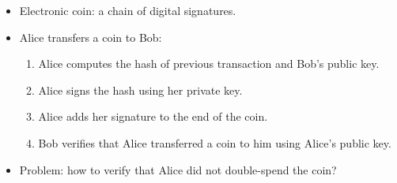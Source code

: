 \documentclass{article}
\begin{document}
\begin{itemize}
  \item Electronic coin: a chain of digital signatures.
  \item Alice transfers a coin to Bob:
    \begin{enumerate}
      \item Alice computes the hash of previous transaction and Bob's public
        key.
      \item Alice signs the hash using her private key.
      \item Alice adds her signature to the end of the coin.
      \item Bob verifies that Alice transferred a coin to him using Alice's
        public key.
    \end{enumerate}
  \item Problem: how to verify that Alice did not double-spend the coin?
\end{itemize}
\end{document}
